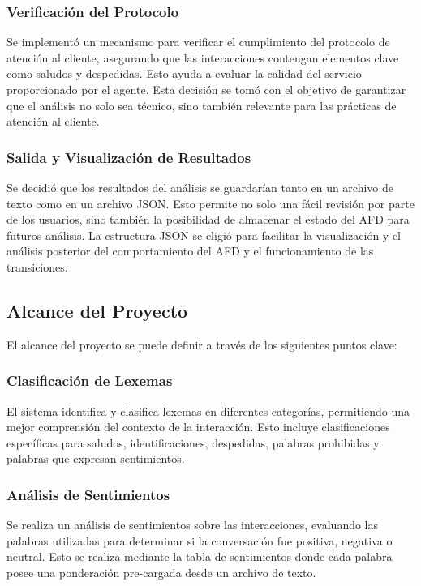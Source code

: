 \documentclass[12pt,a4paper]{article}
\begin{document}
\subsubsection{Verificación del Protocolo}
Se implementó un mecanismo para verificar el cumplimiento del protocolo de atención al cliente, asegurando que las interacciones contengan elementos clave como saludos y despedidas. Esto ayuda a evaluar la calidad del servicio proporcionado por el agente.
Esta decisión se tomó con el objetivo de garantizar que el análisis no solo sea técnico, sino también relevante para las prácticas de atención al cliente.
\subsubsection{Salida y Visualización de Resultados}
Se decidió que los resultados del análisis se guardarían tanto en un archivo de texto como en un archivo JSON. Esto permite no solo una fácil revisión por parte de los usuarios, sino también la posibilidad de almacenar el estado del AFD para futuros análisis.
La estructura JSON se eligió para facilitar la visualización y el análisis posterior del comportamiento del AFD y el funcionamiento de las transiciones.

\subsection{Alcance del Proyecto}
El alcance del proyecto se puede definir a través de los siguientes puntos clave:

\subsubsection{Clasificación de Lexemas}
El sistema identifica y clasifica lexemas en diferentes categorías, permitiendo una mejor comprensión del contexto de la interacción. Esto incluye clasificaciones específicas para saludos, identificaciones, despedidas, palabras prohibidas y palabras que expresan sentimientos.

\subsubsection{Análisis de Sentimientos}
Se realiza un análisis de sentimientos sobre las interacciones, evaluando las palabras utilizadas para determinar si la conversación fue positiva, negativa o neutral. Esto se realiza mediante la tabla de sentimientos donde cada palabra posee una ponderación pre-cargada desde un archivo de texto.
\end{document}

